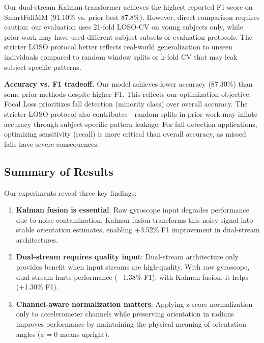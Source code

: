 Our dual-stream Kalman transformer achieves the highest reported F1 score on SmartFallMM (91.10\% vs. prior best 87.8\%). However, direct comparison requires caution: our evaluation uses 21-fold LOSO-CV on young subjects only, while prior work may have used different subject subsets or evaluation protocols. The stricter LOSO protocol better reflects real-world generalization to unseen individuals compared to random window splits or k-fold CV that may leak subject-specific patterns.

\textbf{Accuracy vs. F1 tradeoff.} Our model achieves lower accuracy (87.30\%) than some prior methods despite higher F1. This reflects our optimization objective: Focal Loss prioritizes fall detection (minority class) over overall accuracy. The stricter LOSO protocol also contributes---random splits in prior work may inflate accuracy through subject-specific pattern leakage. For fall detection applications, optimizing sensitivity (recall) is more critical than overall accuracy, as missed falls have severe consequences.

\subsection{Summary of Results}
\label{subsec:summary}

Our experiments reveal three key findings:

\begin{enumerate}
    \item \textbf{Kalman fusion is essential}: Raw gyroscope input degrades performance due to noise contamination. Kalman fusion transforms this noisy signal into stable orientation estimates, enabling +3.52\% F1 improvement in dual-stream architectures.

    \item \textbf{Dual-stream requires quality input}: Dual-stream architecture only provides benefit when input streams are high-quality. With raw gyroscope, dual-stream hurts performance ($-$1.38\% F1); with Kalman fusion, it helps (+1.30\% F1).

    \item \textbf{Channel-aware normalization matters}: Applying z-score normalization only to accelerometer channels while preserving orientation in radians improves performance by maintaining the physical meaning of orientation angles ($\phi = 0$ means upright).
\end{enumerate}

